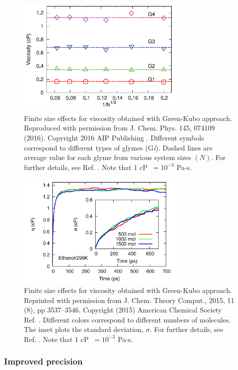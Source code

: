 \documentclass[9pt,bestpractices]{livecoms}
\begin{document}
\begin{figure}[htb!]
	\centering
	\includegraphics[width=3.2in]{MoultosFig3.png}
	\caption{Finite size effects for viscosity obtained with Green-Kubo approach. Reproduced with permission from J. Chem. Phys. 145, 074109 (2016). Copyright 2016 AIP Publishing \cite{Moultos2016}.  Different symbols correspond to different types of glymes (G\textit{i}). Dashed lines are average value for each glyme from various system sizes $(N)$. For further details, see Ref. \cite{Moultos2016}. Note that 1 cP $\ = 10^{-3}$ Pa-s.}
	\label{fig:MoultosFig3}
\end{figure}

\begin{figure}[htb!]
	\centering
	\includegraphics[width=3.2in]{ZhangFig9.png}
	\caption{Finite size effects for viscosity obtained with Green-Kubo approach. Reprinted with permission from J. Chem. Theory Comput., 2015, 11 (8), pp 3537–3546. Copyright (2015) American Chemical Society  Ref. \cite{Zhang2015}. Different colors correspond to different numbers of molecules. The inset plots the standard deviation, $\sigma$. For further details, see Ref. \cite{Zhang2015}. Note that 1 cP $\ = 10^{-3}$ Pa-s.}
	\label{fig:ZhangFig9}
\end{figure}

\subsubsection{Improved precision}	\label{sec:Viscosity:General: Improved precision}
\end{document}
